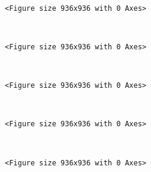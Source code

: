 \documentclass[11pt]{article}
\begin{document}
    
    \begin{center}
    \end{center}
    { \hspace*{\fill} \\}
    
    
    \begin{verbatim}
<Figure size 936x936 with 0 Axes>
    \end{verbatim}

    
    \begin{center}
    \end{center}
    { \hspace*{\fill} \\}
    
    
    \begin{verbatim}
<Figure size 936x936 with 0 Axes>
    \end{verbatim}

    
    \begin{center}
    \end{center}
    { \hspace*{\fill} \\}
    
    
    \begin{verbatim}
<Figure size 936x936 with 0 Axes>
    \end{verbatim}

    
    \begin{center}
    \end{center}
    { \hspace*{\fill} \\}
    
    
    \begin{verbatim}
<Figure size 936x936 with 0 Axes>
    \end{verbatim}

    
    \begin{center}
    \end{center}
    { \hspace*{\fill} \\}
    
    
    \begin{verbatim}
<Figure size 936x936 with 0 Axes>
    \end{verbatim}
\end{document}
